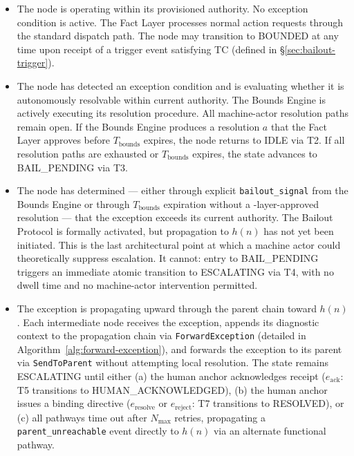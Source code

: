 \begin{itemize}\itemsep0em
\item[\textbf{IDLE.}] The node is operating within its provisioned authority. No exception condition is active. The Fact Layer processes normal action requests through the standard dispatch path. The node may transition to BOUNDED at any time upon receipt of a trigger event satisfying TC (defined in \S\ref{sec:bailout-trigger}).

\item[\textbf{BOUNDED.}] The node has detected an exception condition and is evaluating whether it is autonomously resolvable within current authority. The Bounds Engine is actively executing its resolution procedure. All machine-actor resolution paths remain open. If the Bounds Engine produces a resolution $a$ that the Fact Layer approves before $T_{\text{bounds}}$ expires, the node returns to IDLE via T2. If all resolution paths are exhausted or $T_{\text{bounds}}$ expires, the state advances to BAIL\_PENDING via T3.

\item[\textbf{BAIL\_PENDING.}] The node has determined — either through explicit \texttt{bailout\_signal} from the Bounds Engine or through $T_{\text{bounds}}$ expiration without a \fact-layer-approved resolution — that the exception exceeds its current authority. The Bailout Protocol is formally activated, but propagation to $h(n)$ has not yet been initiated. This is the last architectural point at which a machine actor could theoretically suppress escalation. It cannot: entry to BAIL\_PENDING triggers an immediate atomic transition to ESCALATING via T4, with no dwell time and no machine-actor intervention permitted.

\item[\textbf{ESCALATING.}] The exception is propagating upward through the parent chain toward $h(n)$. Each intermediate node receives the exception, appends its diagnostic context to the propagation chain via \texttt{ForwardException} (detailed in Algorithm~\ref{alg:forward-exception}), and forwards the exception to its parent via \texttt{SendToParent} without attempting local resolution. The state remains ESCALATING until either (a) the human anchor acknowledges receipt ($e_{\text{ack}}$: T5 transitions to HUMAN\_ACKNOWLEDGED), (b) the human anchor issues a binding directive ($e_{\text{resolve}}$ or $e_{\text{reject}}$: T7 transitions to RESOLVED), or (c) all pathways time out after $N_{\max}$ retries, propagating a \texttt{parent\_unreachable} event directly to $h(n)$ via an alternate functional pathway.


\end{itemize}
